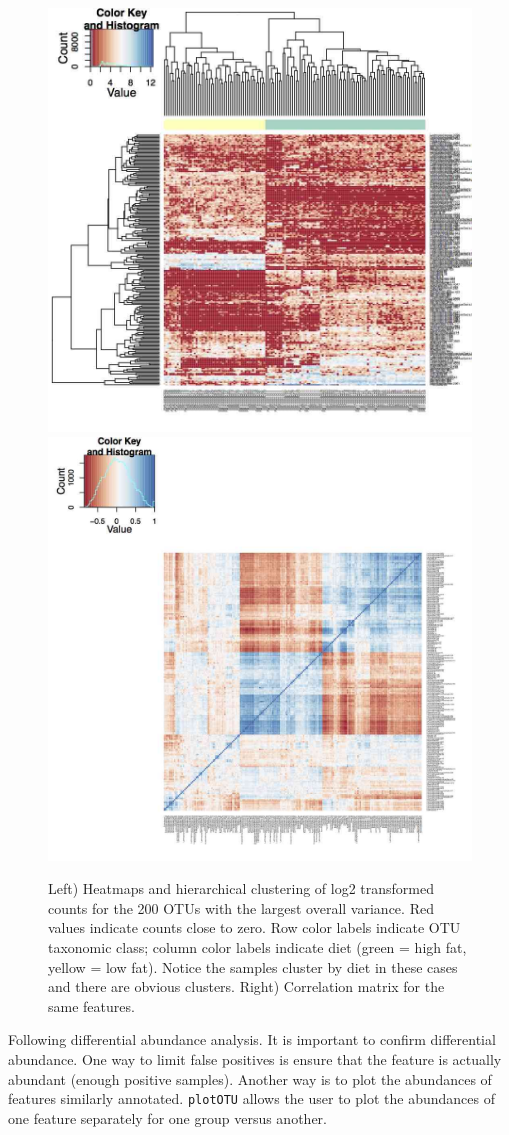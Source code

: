 \documentclass[a4paper,12pt]{article}
\begin{document}
\begin{figure}
\centerline{\includegraphics[width=.55\textwidth]{metagenomeSeq_figure3.png}\includegraphics[width=.55\textwidth]{metagenomeSeq_figure4.png}\label{fig3}}
\caption{Left) Heatmaps and hierarchical clustering of log2 transformed counts for the 200 OTUs with the largest overall variance. Red values indicate counts close to zero. Row color labels indicate OTU taxonomic class; column color labels indicate diet (green = high fat, yellow = low fat). Notice the samples cluster by diet in these cases and there are obvious clusters. Right) Correlation matrix for the same features.}
\end{figure}

Following differential abundance analysis. It is important to confirm differential abundance. One way to limit false positives is ensure that the feature is actually abundant (enough positive samples). Another way is to plot the abundances of features similarly annotated. \texttt{plotOTU} allows the user to plot the abundances of one feature separately for one group versus another.
\end{document}

